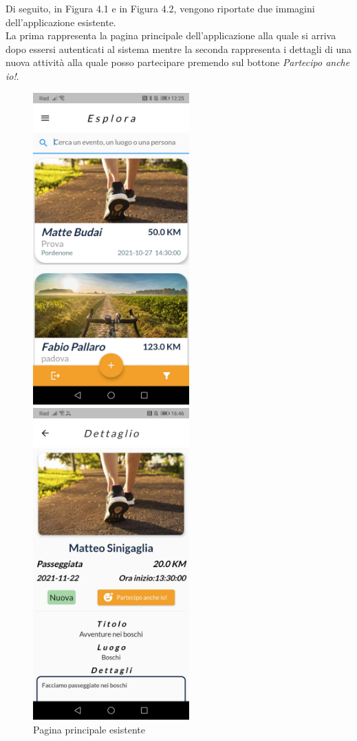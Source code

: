  \newpage
 
 \noindent Di seguito, in Figura 4.1 e in Figura 4.2, vengono riportate due immagini dell'applicazione esistente.\\
 La prima rappresenta la pagina principale dell'applicazione alla quale si arriva dopo essersi autenticati al sistema mentre la seconda rappresenta i dettagli di una nuova attività alla quale posso partecipare premendo sul bottone \textit{Partecipo anche io!}.\\
 
\begin{figure}[htbp]
	\begin{minipage}[b]{0.47\textwidth}
		\centering
		\includegraphics[width=6cm]{immagini/colori.jpeg}
		\caption{Pagina principale esistente}
		\label{fig:Pagina principale esistente}
	\end{minipage}
	\hfill
	\begin{minipage}[b]{0.47\textwidth}
		\centering
		\includegraphics[width=6cm]{immagini/partecipo.jpeg}

\end{minipage}
\end{figure}
